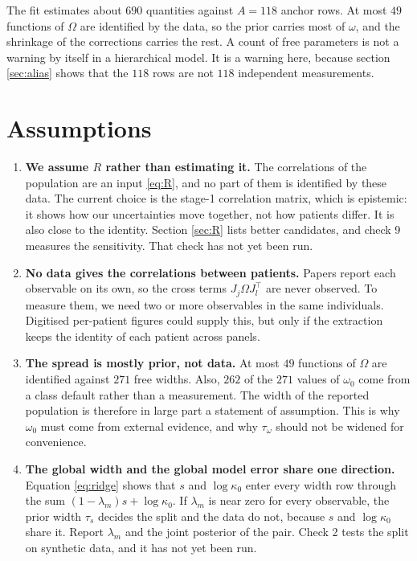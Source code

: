\documentclass[11pt]{article}
\newcommand{\Tr}{^{\!\top}}
\begin{document}
The fit estimates about $690$ quantities against $A=118$ anchor rows.
At most $49$ functions of $\Omega$ are identified by the data, so the prior
carries most of $\omega$, and the shrinkage of the corrections carries the rest.
A count of free parameters is not a warning by itself in a hierarchical model.
It is a warning here, because section \ref{sec:alias} shows that the $118$ rows
are not $118$ independent measurements.

\section{Assumptions}
\label{sec:assump}

\begin{enumerate}[label=(\roman*)]
\item \textbf{We assume $R$ rather than estimating it.} The correlations of the
population are an input \eqref{eq:R}, and no part of them is identified by these
data. The current choice is the stage-1 correlation matrix, which is epistemic:
it shows how our uncertainties move together, not how patients differ. It is
also close to the identity. Section \ref{sec:R} lists better candidates, and
check 9 measures the sensitivity. That check has not yet been run.

\item \textbf{No data gives the correlations between patients.} Papers report
each observable on its own, so the cross terms $J_j\Omega J_l\Tr$ are never
observed. To measure them, we need two or more observables in the same
individuals. Digitised per-patient figures could supply this, but only if the
extraction keeps the identity of each patient across panels.

\item \textbf{The spread is mostly prior, not data.} At most $49$ functions of
$\Omega$ are identified against $271$ free widths. Also, $262$ of the $271$
values of $\omega_0$ come from a class default rather than a measurement. The
width of the reported population is therefore in large part a statement of
assumption. This is why $\omega_0$ must come from external evidence, and why
$\tau_\omega$ should not be widened for convenience.

\item \textbf{The global width and the global model error share one direction.}
Equation \eqref{eq:ridge} shows that $s$ and $\log\kappa_0$ enter every width row
through the sum $(1-\lambda_m)s+\log\kappa_0$. If $\lambda_m$ is near zero for
every observable, the prior width $\tau_s$ decides the split and the data do
not, because $s$ and $\log\kappa_0$ share it. Report $\lambda_m$ and the joint posterior of the pair. Check 2
tests the split on synthetic data, and it has not yet been run.


\end{enumerate}
\end{document}
